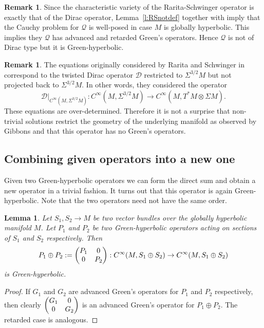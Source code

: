 \documentclass[a4paper,11pt]{amsart}
\newtheorem{lemma}[thm]{Lemma}
\theoremstyle{definition}
\newtheorem{rem}[thm]{Remark}
\begin{document}
\begin{rem}
Since the characteristic variety of the Rarita-Schwinger operator is exactly that of the Dirac operator, Lemma~\ref{l:RSnotdef} together with \cite[Thms. 23.2.4 \& 23.2.7]{Hoerm3} imply that the Cauchy problem for ${\mathcal{Q}}$ is well-posed in case $M$ is globally hyperbolic.
This implies they ${\mathcal{Q}}$ has advanced and retarded Green's operators.
Hence ${\mathcal{Q}}$ is not of Dirac type but it is Green-hyperbolic.
\end{rem}

\begin{rem}
The equations originally considered by Rarita and Schwinger in \cite{RS} correspond to the twisted Dirac operator $\mathcal{D}$ restricted to ${\Sigma^{3/2}M}$ but not projected back to ${\Sigma^{3/2}M}$.
In other words, they considered the operator
$$
\mathcal{D}|_{C^\infty(M,{\Sigma^{3/2}M})} : C^\infty(M,{\Sigma^{3/2}M}) \to C^\infty(M,T^*M\otimes \Sigma M) .
$$
These equations are over-determined.
Therefore it is not a surprise that non-trivial solutions restrict the geometry of the underlying manifold as observed by Gibbons \cite{Gib} and that this operator has no Green's operators.
\end{rem}

\subsection{Combining given operators into a new one}\label{ssec:sum}
Given two Green-hyperbolic operators we can form the direct sum and obtain a new operator in a trivial fashion.
It turns out that this operator is again Green-hyperbolic.
Note that the two operators need not have the same order.

\begin{lemma}
Let $S_1, S_2 \to M$ be two vector bundles over the globally hyperbolic manifold $M$.
Let $P_1$ and $P_2$ be two Green-hyperbolic operators acting on sections of $S_1$ and $S_2$ respectively.
Then 
$$
P_1 \oplus P_2 := \begin{pmatrix}
                         P_1 & 0 \cr
                         0   & P_2
                        \end{pmatrix}
: {C^\infty}(M,S_1\oplus S_2) \to {C^\infty}(M,S_1\oplus S_2)
$$
is Green-hyperbolic.
\end{lemma}

\begin{proof}
If $G_1$ and $G_2$ are advanced Green's operators for $P_1$ and $P_2$ respectively, then clearly $\begin{pmatrix}G_1 & 0 \cr 0   & G_2\end{pmatrix}$ is an advanced Green's operator for $P_1 \oplus P_2$.
The retarded case is analogous.
\end{proof}
\end{document}
